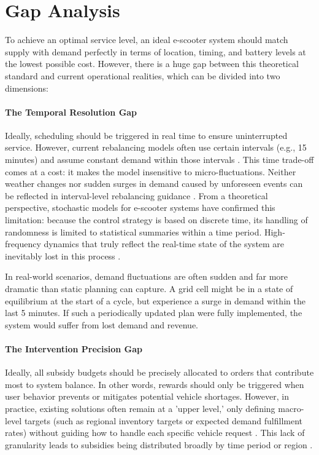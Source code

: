 \section{Gap Analysis}

To achieve an optimal service level, an ideal e-scooter system should match supply with demand perfectly in terms of location, timing, and battery levels at the lowest possible cost. However, there is a huge gap between this theoretical standard and current operational realities, which can be divided into two dimensions:

\paragraph{The Temporal Resolution Gap}

Ideally, scheduling should be triggered in real time to ensure uninterrupted service. However, current rebalancing models often use certain intervals (e.g., 15 minutes) and assume constant demand within those intervals \parencite{guan2024data}. This time trade-off comes at a cost: it makes the model insensitive to micro-fluctuations. Neither weather changes nor sudden surges in demand caused by unforeseen events can be reflected in interval-level rebalancing guidance \parencite{saum2024optimizing}. From a theoretical perspective, stochastic models for e-scooter systems have confirmed this limitation: because the control strategy is based on discrete time, its handling of randomness is limited to statistical summaries within a time period. High-frequency dynamics that truly reflect the real-time state of the system are inevitably lost in this process \parencite{pender2020stochastic}.

In real-world scenarios, demand fluctuations are often sudden and far more dramatic than static planning can capture. A grid cell might be in a state of equilibrium at the start of a cycle, but experience a surge in demand within the last 5 minutes. If such a periodically updated plan were fully implemented, the system would suffer from lost demand and revenue.

\paragraph{The Intervention Precision Gap}

Ideally, all subsidy budgets should be precisely allocated to orders that contribute most to system balance. In other words, rewards should only be triggered when user behavior prevents or mitigates potential vehicle shortages. However, in practice, existing solutions often remain at a 'upper level,' only defining macro-level targets (such as regional inventory targets or expected demand fulfillment rates) without guiding how to handle each specific vehicle request \parencite{guan2024data}. This lack of granularity leads to subsidies being distributed broadly by time period or region \parencite{neijmeijer2020}. 

